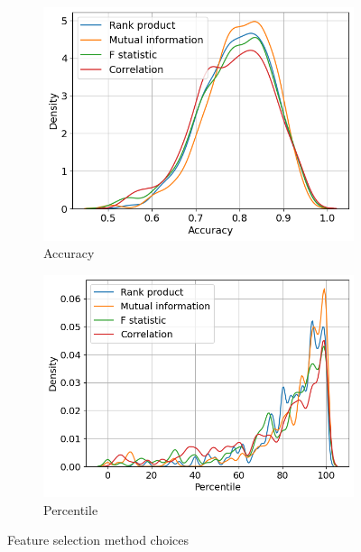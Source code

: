 \begin{figure}[h]
    \centering
    \begin{subfigure}[b]{0.48\textwidth}
        \includegraphics[width=\textwidth]{assets/results/feature-combinations/fsel-accuracy.png}
        \caption{Accuracy}
    \end{subfigure}
    \hfill
    \begin{subfigure}[b]{0.48\textwidth}
        \includegraphics[width=\textwidth]{assets/results/feature-combinations/fsel-percentile.png}
        \caption{Percentile}
    \end{subfigure}
    \caption{Feature selection method choices}
\end{figure}

